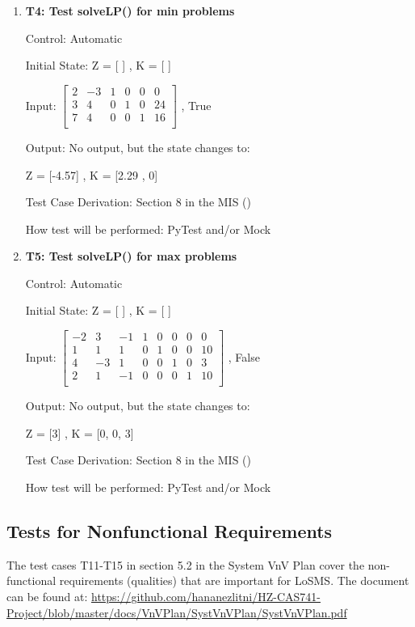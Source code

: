\documentclass[12pt, titlepage]{article}
\newcommand{\famname}{LoSMS}
\begin{document}
\begin{enumerate}
	
	\item{\textbf{T4: Test solveLP() for min problems}}

	Control: Automatic
	
	Initial State: Z = [ ] , K = [ ]
	
	Input: 	$\begin{bmatrix}
	2 & -3 & 1 & 0 & 0 & 0\\
	3 & 4 & 0 & 1 & 0 & 24\\
	7 & 4 & 0 & 0 & 1 & 16\\
	\end{bmatrix}$ , True 
	
	Output: No output, but the state changes to:
	
	Z = [-4.57] , K = [2.29 , 0]
	
	Test Case Derivation: Section 8 in the MIS (\cite{losms-mis})
	
	How test will be performed: PyTest and/or Mock
	
	\item{\textbf{T5: Test solveLP() for max problems}}
	
	Control: Automatic
	
	Initial State: Z = [ ] , K = [ ]
	
	Input: 	$\begin{bmatrix}
	-2 & 3 & -1 & 1 & 0 & 0 & 0 & 0\\
	1 & 1 & 1 & 0 & 1 & 0 & 0 & 10\\
	4 & -3 & 1 & 0 & 0 & 1 & 0 & 3\\
	2 & 1 & -1 & 0 & 0 & 0 & 1 & 10\\
	\end{bmatrix}$ , False 
	
	Output: No output, but the state changes to:
	
	Z = [3] , K = [0, 0, 3]
	
	Test Case Derivation: Section 8 in the MIS (\cite{losms-mis})
	
	How test will be performed: PyTest and/or Mock
		
\end{enumerate}

\subsection{Tests for Nonfunctional Requirements}

The test cases T11-T15 in section 5.2 in the System VnV Plan cover the 
non-functional requirements (qualities) that are important for \famname{}. The 
document can be found at: 
\url{https://github.com/hananezlitni/HZ-CAS741-Project/blob/master/docs/VnVPlan/SystVnVPlan/SystVnVPlan.pdf}
\end{document}
